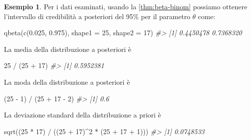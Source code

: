 \documentclass[
]{memoir}
\newenvironment{Shaded}{\begin{snugshade}}{\end{snugshade}}
\newcommand{\AttributeTok}[1]{\textcolor[rgb]{0.77,0.63,0.00}{#1}}
\newcommand{\CommentTok}[1]{\textcolor[rgb]{0.56,0.35,0.01}{\textit{#1}}}
\newcommand{\DecValTok}[1]{\textcolor[rgb]{0.00,0.00,0.81}{#1}}
\newcommand{\FloatTok}[1]{\textcolor[rgb]{0.00,0.00,0.81}{#1}}
\newcommand{\FunctionTok}[1]{\textcolor[rgb]{0.00,0.00,0.00}{#1}}
\newcommand{\NormalTok}[1]{#1}
\newcommand{\SpecialCharTok}[1]{\textcolor[rgb]{0.00,0.00,0.00}{#1}}
\theoremstyle{definition}
\theoremstyle{definition}
\newtheorem{example}{Esempio}[chapter]
\theoremstyle{definition}
\theoremstyle{definition}
\theoremstyle{remark}
\begin{document}
\begin{example}

Per i dati esaminati, usando la \ref{thm:beta-binom} possiamo ottenere l'intervallo di credibilità a posteriori del 95\% per il parametro \(\theta\) come:

\begin{Shaded}
\begin{Highlighting}[]
\FunctionTok{qbeta}\NormalTok{(}\FunctionTok{c}\NormalTok{(}\FloatTok{0.025}\NormalTok{, }\FloatTok{0.975}\NormalTok{), }\AttributeTok{shape1 =} \DecValTok{25}\NormalTok{, }\AttributeTok{shape2 =} \DecValTok{17}\NormalTok{)}
\CommentTok{\#\textgreater{} [1] 0.4450478 0.7368320}
\end{Highlighting}
\end{Shaded}

La media della distribuzione a posteriori è

\begin{Shaded}
\begin{Highlighting}[]
\DecValTok{25} \SpecialCharTok{/}\NormalTok{ (}\DecValTok{25} \SpecialCharTok{+} \DecValTok{17}\NormalTok{)}
\CommentTok{\#\textgreater{} [1] 0.5952381}
\end{Highlighting}
\end{Shaded}

La moda della distribuzione a posteriori è

\begin{Shaded}
\begin{Highlighting}[]
\NormalTok{(}\DecValTok{25} \SpecialCharTok{{-}} \DecValTok{1}\NormalTok{) }\SpecialCharTok{/}\NormalTok{ (}\DecValTok{25} \SpecialCharTok{+} \DecValTok{17} \SpecialCharTok{{-}} \DecValTok{2}\NormalTok{)}
\CommentTok{\#\textgreater{} [1] 0.6}
\end{Highlighting}
\end{Shaded}

La deviazione standard della distribuzione a priori è

\begin{Shaded}
\begin{Highlighting}[]
\FunctionTok{sqrt}\NormalTok{((}\DecValTok{25} \SpecialCharTok{*} \DecValTok{17}\NormalTok{) }\SpecialCharTok{/}\NormalTok{ ((}\DecValTok{25} \SpecialCharTok{+} \DecValTok{17}\NormalTok{)}\SpecialCharTok{\^{}}\DecValTok{2} \SpecialCharTok{*}\NormalTok{ (}\DecValTok{25} \SpecialCharTok{+} \DecValTok{17} \SpecialCharTok{+} \DecValTok{1}\NormalTok{)))}
\CommentTok{\#\textgreater{} [1] 0.0748533}
\end{Highlighting}
\end{Shaded}

\end{example}
\end{document}
